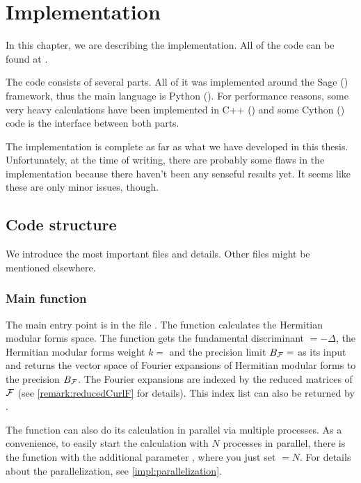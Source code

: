 
\section{Implementation}
\label{chapter:impl}

In this chapter, we are describing the implementation. All of the code can be found at \cite{Zeyer13Github}.

The code consists of several parts.
All of it was implemented around the Sage (\cite{sage}) framework, thus the main language is Python (\cite{python}).
For performance reasons, some very heavy calculations have been implemented in C++ (\cite{cpp}) and some Cython (\cite{cython}) code is the interface between both parts.

The implementation is complete as far as what we have developed in this thesis. Unfortunately, at the time of writing, there are probably some flaws in the implementation because there haven't been any senseful results yet. It seems like these are only minor issues, though.

\subsection{Code structure}

We introduce the most important files and details. Other files might be mentioned elsewhere.

\subsubsection{Main function }
The main entry point is in the file .
The function  calculates the Hermitian modular forms space.
The function gets the fundamental discriminant  $= - \Delta$, the Hermitian modular forms weight $k =$  and the precision limit $B_{\mathcal{F}} =$  as its input and returns the vector space of Fourier expansions of Hermitian modular forms to the precision $B_{\mathcal{F}}$. The Fourier expansions are indexed by the reduced matrices of $\mathcal{F}$ (see \cref{remark:reducedCurlF} for details). This index list can also be returned by .

The function can also do its calculation in parallel via multiple processes. As a convenience, to easily start the calculation with $N$ processes in parallel, there is the function  with the additional parameter , where you just set  $=N$. For details about the parallelization, see \cref{impl:parallelization}.

